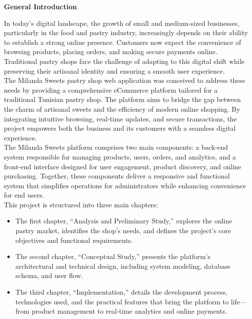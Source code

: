 \newpage
{}
\begin{center}
    {\huge \textbf{General Introduction}}\\
\end{center}

\vspace{1cm} 

In today’s digital landscape, the growth of small and medium-sized businesses,
particularly in the food and pastry industry, increasingly depends on their ability to establish
a strong online presence. Customers now expect the convenience of browsing products,
placing orders, and making secure payments online. Traditional pastry shops face the
challenge of adapting to this digital shift while preserving their artisanal identity and ensuring
a smooth user experience.\\

The Milanda Sweets pastry shop web application was conceived to address these
needs by providing a comprehensive eCommerce platform tailored for a traditional Tunisian
pastry shop. The platform aims to bridge the gap between the charm of artisanal sweets and
the efficiency of modern online shopping. By integrating intuitive browsing, real-time
updates, and secure transactions, the project empowers both the business and its customers
with a seamless digital experience.\\

The Milanda Sweets platform comprises two main components: a back-end system
responsible for managing products, users, orders, and analytics, and a front-end interface
designed for user engagement, product discovery, and online purchasing. Together, these
components deliver a responsive and functional system that simplifies operations for
administrators while enhancing convenience for end users.\\

This project is structured into three main chapters:
\begin{itemize}[label=]
    \item The first chapter, “Analysis and Preliminary Study,” explores the online pastry
market, identifies the shop’s needs, and defines the project’s core objectives and
functional requirements.
    \item The second chapter, “Conceptual Study,” presents the platform’s architectural
and technical design, including system modeling, database schema, and user flow.
    \item The third chapter, “Implementation,” details the development process,
technologies used, and the practical features that bring the platform to life—from
product management to real-time analytics and online payments.\\
\end{itemize} 

